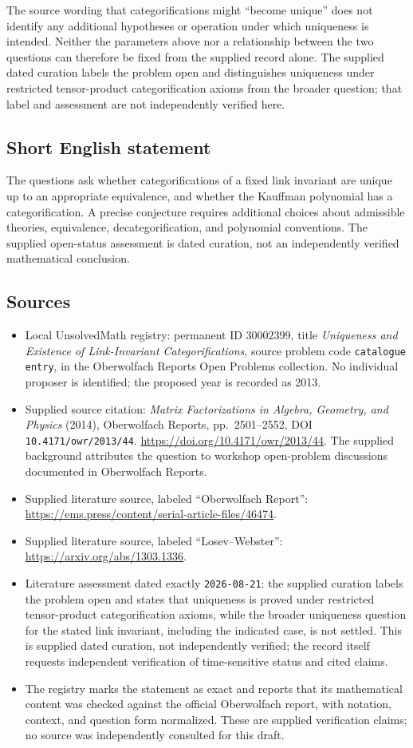 \documentclass[11pt]{article}
\begin{document}
The source wording that categorifications might ``become unique'' does not identify any additional hypotheses or operation under which uniqueness is intended. Neither the parameters above nor a relationship between the two questions can therefore be fixed from the supplied record alone. The supplied dated curation labels the problem open and distinguishes uniqueness under restricted tensor-product categorification axioms from the broader question; that label and assessment are not independently verified here.
\subsection{Short English statement}
The questions ask whether categorifications of a fixed link invariant are unique up to an appropriate equivalence, and whether the Kauffman polynomial has a categorification. A precise conjecture requires additional choices about admissible theories, equivalence, decategorification, and polynomial conventions. The supplied open-status assessment is dated curation, not an independently verified mathematical conclusion.
\subsection{Sources}
\begin{itemize}
\item Local UnsolvedMath registry: permanent ID \(30002399\), title \emph{Uniqueness and Existence of Link-Invariant Categorifications}, source problem code \texttt{catalogue entry}, in the Oberwolfach Reports Open Problems collection. No individual proposer is identified; the proposed year is recorded as 2013.
\item Supplied source citation: \emph{Matrix Factorizations in Algebra, Geometry, and Physics} (2014), Oberwolfach Reports, pp.\ 2501--2552, DOI \texttt{10.4171/owr/2013/44}. \url{https://doi.org/10.4171/owr/2013/44}. The supplied background attributes the question to workshop open-problem discussions documented in Oberwolfach Reports.
\item Supplied literature source, labeled ``Oberwolfach Report'': \url{https://ems.press/content/serial-article-files/46474}.
\item Supplied literature source, labeled ``Losev--Webster'': \url{https://arxiv.org/abs/1303.1336}.
\item Literature assessment dated exactly \texttt{2026-08-21}: the supplied curation labels the problem open and states that uniqueness is proved under restricted tensor-product categorification axioms, while the broader uniqueness question for the stated link invariant, including the indicated case, is not settled. This is supplied dated curation, not independently verified; the record itself requests independent verification of time-sensitive status and cited claims.
\item The registry marks the statement as exact and reports that its mathematical content was checked against the official Oberwolfach report, with notation, context, and question form normalized. These are supplied verification claims; no source was independently consulted for this draft.
\end{itemize}
\end{document}
